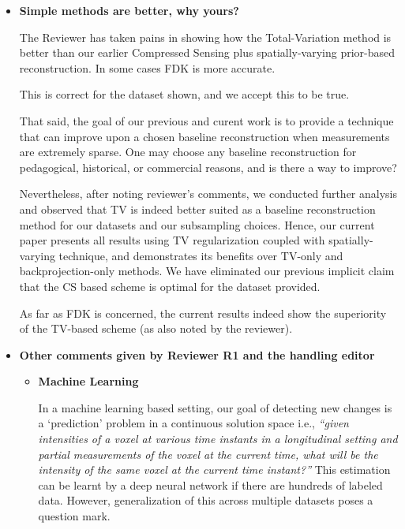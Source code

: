 \documentclass{article}
\begin{document}
\begin{itemize}
\item \textbf{Simple methods are better, why yours?}
  
The Reviewer has taken pains in showing how the Total-Variation method
is better than our earlier Compressed Sensing plus spatially-varying
prior-based reconstruction. In some cases FDK is more accurate.

This is correct for the dataset shown, and we accept this to be true.

  That said, the goal of our previous and curent work is to provide a
  technique that can improve upon a chosen baseline reconstruction
  when measurements are extremely sparse. One may choose any baseline
  reconstruction for pedagogical, historical, or commercial reasons,
  and is there a way to improve?
  
  Nevertheless, after noting reviewer's comments, we conducted further
  analysis and observed that TV is indeed better suited as a baseline
  reconstruction method for our datasets and our subsampling
  choices. Hence, our current paper presents all results using TV
  regularization coupled with spatially-varying technique, and
  demonstrates its benefits over TV-only and backprojection-only
  methods.  We have eliminated our previous implicit claim that the CS
  based scheme is optimal for the dataset provided.

  As far as FDK is concerned, the current results indeed show the
  superiority of the TV-based scheme (as also noted by the reviewer).
  
\item \textbf{Other comments given by Reviewer R1 and the handling editor}

 \begin{itemize}
  \item \textbf{Machine Learning}
  
  In a machine learning based setting, our goal of detecting new
  changes is a `prediction' problem in a continuous solution space
  i.e., \textit{``given intensities of a voxel at various time
    instants in a longitudinal setting and partial measurements of the
    voxel at the current time, what will be the intensity of the same
    voxel at the current time instant?''} This estimation can be
  learnt by a deep neural network if there are hundreds of labeled
  data.  However, generalization of this across multiple datasets
  poses a question mark. 
  


\end{itemize}
\end{itemize}
\end{document}
